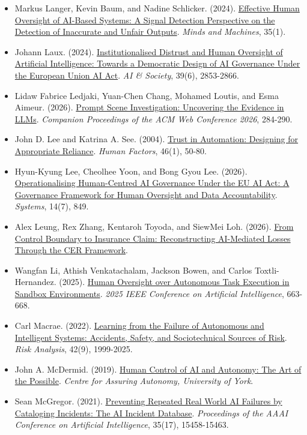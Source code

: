 \documentclass[11pt]{article}
\begin{document}
\begin{itemize}[leftmargin=*]
\item Markus Langer, Kevin Baum, and Nadine Schlicker. (2024). \href{https://doi.org/10.1007/s11023-024-09701-0}{Effective Human Oversight of AI-Based Systems: A Signal Detection Perspective on the Detection of Inaccurate and Unfair Outputs}. \emph{Minds and Machines}, 35(1).
\item Johann Laux. (2024). \href{https://doi.org/10.1007/s00146-023-01777-z}{Institutionalised Distrust and Human Oversight of Artificial Intelligence: Towards a Democratic Design of AI Governance Under the European Union AI Act}. \emph{AI \& Society}, 39(6), 2853-2866.
\item Lidaw Fabrice Ledjaki, Yuan-Chen Chang, Mohamed Loutis, and Esma Aimeur. (2026). \href{https://doi.org/10.1145/3774905.3795469}{Prompt Scene Investigation: Uncovering the Evidence in LLMs}. \emph{Companion Proceedings of the ACM Web Conference 2026}, 284-290.
\item John D. Lee and Katrina A. See. (2004). \href{https://doi.org/10.1518/hfes.46.1.50_30392}{Trust in Automation: Designing for Appropriate Reliance}. \emph{Human Factors}, 46(1), 50-80.
\item Hyun-Kyung Lee, Cheolhee Yoon, and Bong Gyou Lee. (2026). \href{https://doi.org/10.3390/systems14070849}{Operationalising Human-Centred AI Governance Under the EU AI Act: A Governance Framework for Human Oversight and Data Accountability}. \emph{Systems}, 14(7), 849.
\item Alex Leung, Rex Zhang, Kentaroh Toyoda, and SiewMei Loh. (2026). \href{https://arxiv.org/abs/2606.03777}{From Control Boundary to Insurance Claim: Reconstructing AI-Mediated Losses Through the CER Framework}.
\item Wangfan Li, Athish Venkatachalam, Jackson Bowen, and Carlos Toxtli-Hernandez. (2025). \href{https://doi.org/10.1109/CAI64502.2025.00121}{Human Oversight over Autonomous Task Execution in Sandbox Environments}. \emph{2025 IEEE Conference on Artificial Intelligence}, 663-668.
\item Carl Macrae. (2022). \href{https://doi.org/10.1111/risa.13850}{Learning from the Failure of Autonomous and Intelligent Systems: Accidents, Safety, and Sociotechnical Sources of Risk}. \emph{Risk Analysis}, 42(9), 1999-2025.
\item John A. McDermid. (2019). \href{https://www.york.ac.uk/assuring-autonomy/news/blog/human-control-ai-autonomy/}{Human Control of AI and Autonomy: The Art of the Possible}. \emph{Centre for Assuring Autonomy, University of York}.
\item Sean McGregor. (2021). \href{https://doi.org/10.1609/aaai.v35i17.17817}{Preventing Repeated Real World AI Failures by Cataloging Incidents: The AI Incident Database}. \emph{Proceedings of the AAAI Conference on Artificial Intelligence}, 35(17), 15458-15463.

\end{itemize}
\end{document}
